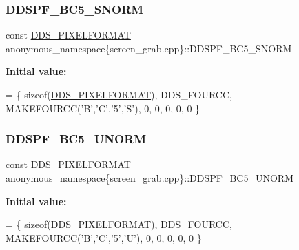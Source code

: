 \subsubsection{\texorpdfstring{D\+D\+S\+P\+F\+\_\+\+B\+C5\+\_\+\+S\+N\+O\+RM}{DDSPF\_BC5\_SNORM}}
{\footnotesize\ttfamily const \mbox{\hyperlink{structanonymous__namespace_02screen__grab_8cpp_03_1_1_d_d_s___p_i_x_e_l_f_o_r_m_a_t}{D\+D\+S\+\_\+\+P\+I\+X\+E\+L\+F\+O\+R\+M\+AT}} anonymous\+\_\+namespace\{screen\+\_\+grab.\+cpp\}\+::D\+D\+S\+P\+F\+\_\+\+B\+C5\+\_\+\+S\+N\+O\+RM}

{\bfseries Initial value\+:}
\begin{DoxyCode}
=
        \{ \textcolor{keyword}{sizeof}(\mbox{\hyperlink{struct_d_d_s___p_i_x_e_l_f_o_r_m_a_t}{DDS\_PIXELFORMAT}}), DDS\_FOURCC, MAKEFOURCC(\textcolor{charliteral}{'B'},\textcolor{charliteral}{'C'},\textcolor{charliteral}{'5'},\textcolor{charliteral}{'S'}), 0, 0, 0, 0, 0 \}
\end{DoxyCode}
\mbox{\label{namespaceanonymous__namespace_02screen__grab_8cpp_03_a2dc57874babf0451c5942feb40cb8a6e}} 
\subsubsection{\texorpdfstring{D\+D\+S\+P\+F\+\_\+\+B\+C5\+\_\+\+U\+N\+O\+RM}{DDSPF\_BC5\_UNORM}}
{\footnotesize\ttfamily const \mbox{\hyperlink{structanonymous__namespace_02screen__grab_8cpp_03_1_1_d_d_s___p_i_x_e_l_f_o_r_m_a_t}{D\+D\+S\+\_\+\+P\+I\+X\+E\+L\+F\+O\+R\+M\+AT}} anonymous\+\_\+namespace\{screen\+\_\+grab.\+cpp\}\+::D\+D\+S\+P\+F\+\_\+\+B\+C5\+\_\+\+U\+N\+O\+RM}

{\bfseries Initial value\+:}
\begin{DoxyCode}
=
        \{ \textcolor{keyword}{sizeof}(\mbox{\hyperlink{struct_d_d_s___p_i_x_e_l_f_o_r_m_a_t}{DDS\_PIXELFORMAT}}), DDS\_FOURCC, MAKEFOURCC(\textcolor{charliteral}{'B'},\textcolor{charliteral}{'C'},\textcolor{charliteral}{'5'},\textcolor{charliteral}{'U'}), 0, 0, 0, 0, 0 \}
\end{DoxyCode}
\mbox{\label{namespaceanonymous__namespace_02screen__grab_8cpp_03_a19039f75bb2c7d22ba53da0230a34dcb}} 
